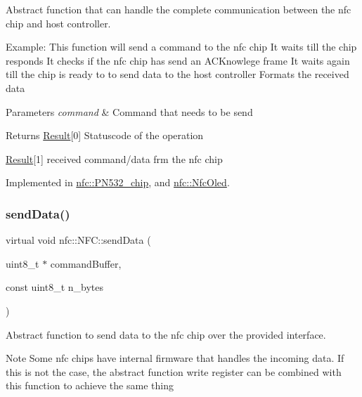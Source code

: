 Abstract function that can handle the complete communication between the nfc chip and host controller. 

Example\+: This function will send a command to the nfc chip It waits till the chip responds It checks if the nfc chip has send an A\+C\+Knowlege frame It waits again till the chip is ready to to send data to the host controller Formats the received data 
\begin{DoxyParams}{Parameters}
{\em command} & Command that needs to be send \\
\hline
\end{DoxyParams}
\begin{DoxyReturn}{Returns}
\hyperlink{structnfc_1_1Result}{Result}\mbox{[}0\mbox{]} Statuscode of the operation 

\hyperlink{structnfc_1_1Result}{Result}\mbox{[}1\mbox{]} received command/data frm the nfc chip 
\end{DoxyReturn}


Implemented in \hyperlink{classnfc_1_1PN532__chip_a3184528f3e8e793905d1638067cfe9e1}{nfc\+::\+P\+N532\+\_\+chip}, and \hyperlink{classnfc_1_1NfcOled_afcd62a218b26b6d7a59eb27fdc7b1c78}{nfc\+::\+Nfc\+Oled}.

\mbox{\label{classnfc_1_1NFC_af8fe01b21da65e4e8334f802073168ab}} 
\subsubsection{\texorpdfstring{send\+Data()}{sendData()}}
{\footnotesize\ttfamily virtual void nfc\+::\+N\+F\+C\+::send\+Data (\begin{DoxyParamCaption}\item[{uint8\+\_\+t $\ast$}]{command\+Buffer,  }\item[{const uint8\+\_\+t}]{n\+\_\+bytes }\end{DoxyParamCaption})\hspace{0.3cm}{\ttfamily [pure virtual]}}



Abstract function to send data to the nfc chip over the provided interface. 

\begin{DoxyNote}{Note}
Some nfc chips have internal firmware that handles the incoming data. If this is not the case, the abstract function write register can be combined with this function to achieve the same thing 
\end{DoxyNote}

